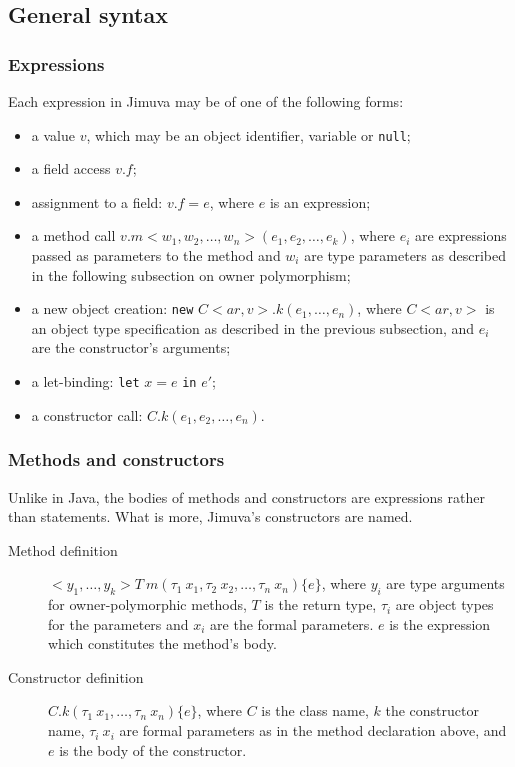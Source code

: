 \documentclass{pracamgr}
\theoremstyle{break}
\theoremstyle{break}
\theoremstyle{break}
\begin{document}
\subsection{General syntax}

\subsubsection{Expressions}

Each expression in Jimuva may be of one of the following forms: 
\begin{itemize}
  \item a value $v$, which may be an object identifier, variable or
    \texttt{null}; 
  \item a field access $v.f$; 
  \item assignment to a field: $v.f = e$, where $e$ is an expression; 
  \item a method call $v.m<w_1, w_2, \dots, w_n>(e_1, e_2, \dots,
    e_k)$, where $e_i$ are expressions passed as parameters to the
    method and $w_i$ are type parameters as described in the following
    subsection on owner polymorphism;
  \item a new object creation: \texttt{new} $C<ar, v>.k(e_1, \dots,
    e_n)$, where $C<ar, v>$ is an object type specification as
    described in the previous subsection, and $e_i$ are the
    constructor's arguments;
  \item a let-binding: \texttt{let} $x = e$ \texttt{in} $e'$; 
  \item a constructor call: $C.k(e_1, e_2, \dots, e_n)$.
\end{itemize}

\subsubsection{Methods and constructors}

Unlike in Java, the bodies of methods and constructors are expressions
rather than statements. What is more, Jimuva's constructors are named.

\begin{description}
\item[Method definition] $<y_1, \dots, y_k> T\ m(\tau_1\ x_1, \tau_2\
  x_2, \dots, \tau_n\ x_n) \lbrace e \rbrace$, where $y_i$ are type
  arguments for owner-polymorphic methods, $T$ is the return type,
  $\tau_i$ are object types for the parameters and $x_i$ are the
  formal parameters. $e$ is the expression which constitutes the
  method's body.
\item[Constructor definition] $C.k(\tau_1\ x_1, \dots, \tau_n\ x_n)
  \lbrace e \rbrace$, where $C$ is the class name, $k$ the constructor
  name, $\tau_i\ x_i$ are formal parameters as in the method
  declaration above, and $e$ is the body of the constructor. 
\end{description}
\end{document}
